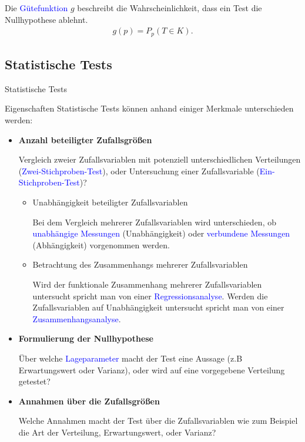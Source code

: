\documentclass{beamer}
\def\b{\textcolor{blue}}
\begin{document}
\begin{frame}
    Die \b{Gütefunktion} $g$ beschreibt die Wahrscheinlichkeit, dass ein Test die Nullhypothese ablehnt.
    \begin{align*}
        g(p) = P_p(T \in K).
    \end{align*}
\end{frame}

\subsection{Statistische Tests}
\begin{frame}{Statistische Tests}
    \begin{block}{Eigenschaften}
        Statistische Tests können anhand einiger Merkmale unterschieden werden:
        \begin{itemize}
            \item \textbf{Anzahl beteiligter Zufallsgrößen}\pause\par
                Vergleich zweier Zufallsvariablen mit potenziell unterschiedlichen Verteilungen (\b{Zwei-Stichproben-Test}), oder Untersuchung einer Zufallsvariable (\b{Ein-Stichproben-Test})?\pause
                \begin{itemize}
                    \item Unabhängigkeit beteiligter Zufallsvariablen\par
                        Bei dem Vergleich mehrerer Zufallsvariablen wird unterschieden, ob \b{unabhängige Messungen} (Unabhängigkeit) oder \b{verbundene Messungen} (Abhängigkeit) vorgenommen werden.\pause
                    \item Betrachtung des Zusammenhangs mehrerer Zufallsvariablen\par
                        Wird der funktionale Zusammenhang mehrerer Zufallsvariablen untersucht spricht man von einer \b{Regressionsanalyse}. Werden die Zufallsvariablen auf Unabhängigkeit untersucht spricht man von einer \b{Zusammenhangsanalyse}.
                \end{itemize}
        \end{itemize}
    \end{block}
\end{frame}

\begin{frame}
    \begin{itemize}
        \item \textbf{Formulierung der Nullhypothese}\pause\par
            Über welche \b{Lageparameter} macht der Test eine Aussage (z.B Erwartungswert oder Varianz), oder wird auf eine vorgegebene Verteilung getestet?\pause
        \item \textbf{Annahmen über die Zufallsgrößen}\pause\par
            Welche Annahmen macht der Test über die Zufallsvariablen wie zum Beispiel die Art der Verteilung, Erwartungswert, oder Varianz?
    \end{itemize}
\end{frame}
\end{document}
